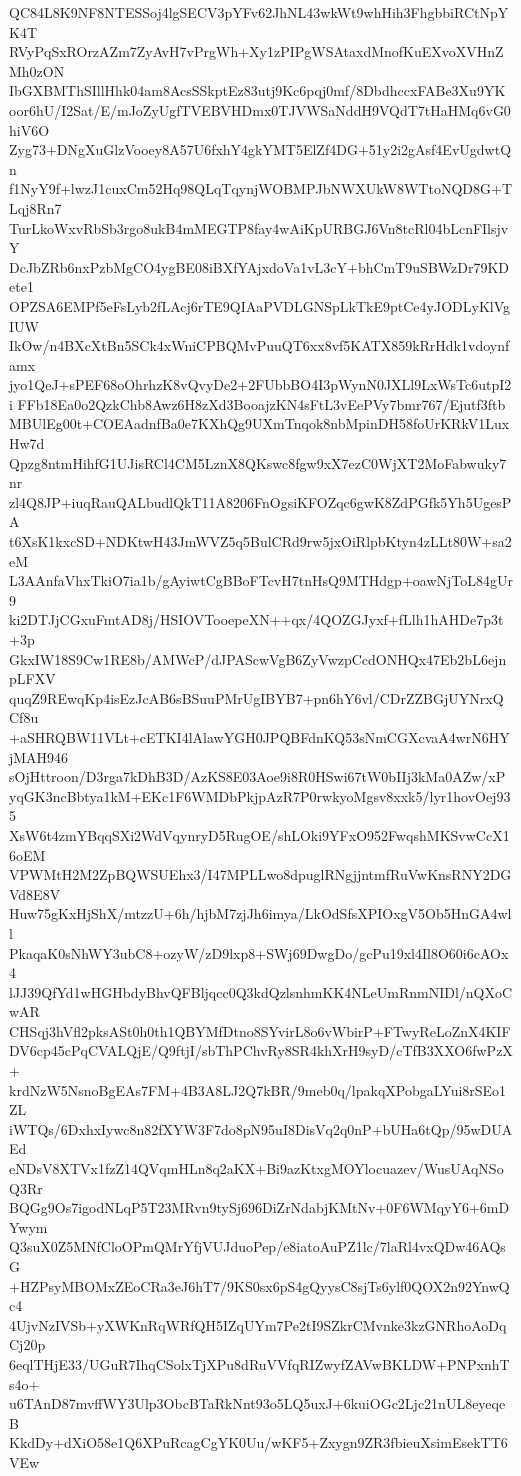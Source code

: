 QC84L8K9NF8NTESSoj4lgSECV3pYFv62JhNL43wkWt9whHih3FhgbbiRCtNpYK4T
RVyPqSxROrzAZm7ZyAvH7vPrgWh+Xy1zPIPgWSAtaxdMnofKuEXvoXVHnZMh0zON
IbGXBMThSIllHhk04am8AcsSSkptEz83utj9Kc6pqj0mf/8DbdhccxFABe3Xu9YK
oor6hU/I2Sat/E/mJoZyUgfTVEBVHDmx0TJVWSaNddH9VQdT7tHaHMq6vG0hiV6O
Zyg73+DNgXuGlzVooey8A57U6fxhY4gkYMT5ElZf4DG+51y2i2gAsf4EvUgdwtQn
f1NyY9f+lwzJ1cuxCm52Hq98QLqTqynjWOBMPJbNWXUkW8WTtoNQD8G+TLqj8Rn7
TurLkoWxvRbSb3rgo8ukB4mMEGTP8fay4wAiKpURBGJ6Vn8tcRl04bLcnFIlsjvY
DcJbZRb6nxPzbMgCO4ygBE08iBXfYAjxdoVa1vL3cY+bhCmT9uSBWzDr79KDete1
OPZSA6EMPf5eFsLyb2fLAcj6rTE9QIAaPVDLGNSpLkTkE9ptCe4yJODLyKlVgIUW
IkOw/n4BXcXtBn5SCk4xWniCPBQMvPuuQT6xx8vf5KATX859kRrHdk1vdoynfamx
jyo1QeJ+sPEF68oOhrhzK8vQvyDe2+2FUbbBO4I3pWynN0JXLl9LxWsTc6utpI2i
FFb18Ea0o2QzkChb8Awz6H8zXd3BooajzKN4sFtL3vEePVy7bmr767/Ejutf3ftb
MBUlEg00t+COEAadnfBa0e7KXhQg9UXmTnqok8nbMpinDH58foUrKRkV1LuxHw7d
Qpzg8ntmHihfG1UJisRCl4CM5LznX8QKswc8fgw9xX7ezC0WjXT2MoFabwuky7nr
zl4Q8JP+iuqRauQALbudlQkT11A8206FnOgsiKFOZqc6gwK8ZdPGfk5Yh5UgesPA
t6XsK1kxcSD+NDKtwH43JmWVZ5q5BulCRd9rw5jxOiRlpbKtyn4zLLt80W+sa2eM
L3AAnfaVhxTkiO7ia1b/gAyiwtCgBBoFTcvH7tnHsQ9MTHdgp+oawNjToL84gUr9
ki2DTJjCGxuFmtAD8j/HSIOVTooepeXN++qx/4QOZGJyxf+fLlh1hAHDe7p3t+3p
GkxIW18S9Cw1RE8b/AMWcP/dJPAScwVgB6ZyVwzpCcdONHQx47Eb2bL6ejnpLFXV
quqZ9REwqKp4isEzJcAB6sBSuuPMrUgIBYB7+pn6hY6vl/CDrZZBGjUYNrxQCf8u
+aSHRQBW11VLt+cETKI4lAlawYGH0JPQBFdnKQ53sNmCGXcvaA4wrN6HYjMAH946
sOjHttroon/D3rga7kDhB3D/AzKS8E03Aoe9i8R0HSwi67tW0bIIj3kMa0AZw/xP
yqGK3ncBbtya1kM+EKc1F6WMDbPkjpAzR7P0rwkyoMgsv8xxk5/lyr1hovOej935
XsW6t4zmYBqqSXi2WdVqynryD5RugOE/shLOki9YFxO952FwqshMKSvwCcX16oEM
VPWMtH2M2ZpBQWSUEhx3/I47MPLLwo8dpuglRNgjjntmfRuVwKnsRNY2DGVd8E8V
Huw75gKxHjShX/mtzzU+6h/hjbM7zjJh6imya/LkOdSfsXPIOxgV5Ob5HnGA4wll
PkaqaK0sNhWY3ubC8+ozyW/zD9lxp8+SWj69DwgDo/gcPu19xl4Il8O60i6cAOx4
lJJ39QfYd1wHGHbdyBhvQFBljqcc0Q3kdQzlsnhmKK4NLeUmRnmNIDl/nQXoCwAR
CHSqj3hVfl2pksASt0h0th1QBYMfDtno8SYvirL8o6vWbirP+FTwyReLoZnX4KIF
DV6cp45cPqCVALQjE/Q9ftjI/sbThPChvRy8SR4khXrH9syD/cTfB3XXO6fwPzX+
krdNzW5NsnoBgEAs7FM+4B3A8LJ2Q7kBR/9meb0q/lpakqXPobgaLYui8rSEo1ZL
iWTQs/6DxhxIywc8n82fXYW3F7do8pN95uI8DisVq2q0nP+bUHa6tQp/95wDUAEd
eNDsV8XTVx1fzZ14QVqmHLn8q2aKX+Bi9azKtxgMOYlocuazev/WusUAqNSoQ3Rr
BQGg9Os7igodNLqP5T23MRvn9tySj696DiZrNdabjKMtNv+0F6WMqyY6+6mDYwym
Q3suX0Z5MNfCloOPmQMrYfjVUJduoPep/e8iatoAuPZ1lc/7laRl4vxQDw46AQsG
+HZPsyMBOMxZEoCRa3eJ6hT7/9KS0sx6pS4gQyysC8sjTs6ylf0QOX2n92YnwQc4
4UjvNzIVSb+yXWKnRqWRfQH5IZqUYm7Pe2tI9SZkrCMvnke3kzGNRhoAoDqCj20p
6eqlTHjE33/UGuR7IhqCSolxTjXPu8dRuVVfqRIZwyfZAVwBKLDW+PNPxnhTs4o+
u6TAnD87mvffWY3Ulp3ObcBTaRkNnt93o5LQ5uxJ+6kuiOGc2Ljc21nUL8eyeqeB
KkdDy+dXiO58e1Q6XPuRcagCgYK0Uu/wKF5+Zxygn9ZR3fbieuXsimEsekTT6VEw
